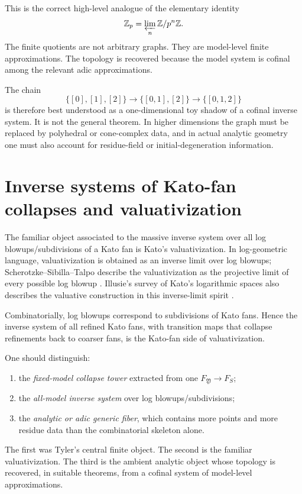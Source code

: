 \documentclass[11pt]{article}
\newcommand{\Z}{\mathbb Z}
\newcommand{\mfY}{\mathfrak Y}
\begin{document}
This is the correct high-level analogue of the elementary identity
\[
\Z_p=\varprojlim_n \Z/p^n\Z.
\]
The finite quotients are not arbitrary graphs. They are model-level finite approximations. The topology is recovered because the model system is cofinal among the relevant adic approximations.

The chain
\[
\{[0],[1],[2]\}
\to
\{[0,1],[2]\}
\to
\{[0,1,2]\}
\]
is therefore best understood as a one-dimensional toy shadow of a cofinal inverse system. It is not the general theorem. In higher dimensions the graph must be replaced by polyhedral or cone-complex data, and in actual analytic geometry one must also account for residue-field or initial-degeneration information.

\section{Inverse systems of Kato-fan collapses and valuativization}

The familiar object associated to the massive inverse system over all log blowups/subdivisions of a Kato fan is Kato's valuativization. In log-geometric language, valuativization is obtained as an inverse limit over log blowups; Scherotzke--Sibilla--Talpo describe the valuativization as the projective limit of every possible log blowup \cite{ScherotzkeSibillaTalpo}. Illusie's survey of Kato's logarithmic spaces also describes the valuative construction in this inverse-limit spirit \cite{IllusieLogSpaces,KatoLogDieudonne}.

Combinatorially, log blowups correspond to subdivisions of Kato fans. Hence the inverse system of all refined Kato fans, with transition maps that collapse refinements back to coarser fans, is the Kato-fan side of valuativization.

One should distinguish:
\begin{enumerate}[leftmargin=2em]
\item the \emph{fixed-model collapse tower} extracted from one $F_{\mfY}\to F_S$;
\item the \emph{all-model inverse system} over log blowups/subdivisions;
\item the \emph{analytic or adic generic fiber}, which contains more points and more residue data than the combinatorial skeleton alone.
\end{enumerate}
The first was Tyler's central finite object. The second is the familiar valuativization. The third is the ambient analytic object whose topology is recovered, in suitable theorems, from a cofinal system of model-level approximations.
\end{document}

